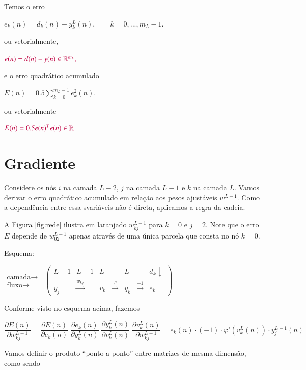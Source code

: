 \documentclass[12pt,a4paper]{article}
\def\RR{\mathbb{R}}
\begin{document}
\noindent Temos o erro

$
e_k(n) = d_k(n) - y^L_k(n), \qquad k=0,...,m_L-1.
$

ou vetorialmente,

$\color{purple}
e(n) = d(n)-y(n) \in\RR^{m_L},
$

\noindent e o erro quadrático acumulado

$
\displaystyle E(n) = 0.5\sum_{k=0}^{m_L-1}e_k^2(n).
$

ou vetorialmente

$\color{purple}
E(n) = 0.5e(n)^Te(n) \in\RR
$








\section{Gradiente}
Considere os nós $i$ na camada $L-2$, $j$ na camada $L-1$ e $k$ na camada $L$. Vamos derivar o erro quadrático acumulado em relação aos pesos ajustáveis $w^{L-1}$. Como a dependência entre essa svariáveis não é direta, aplicamos a regra da cadeia.

A Figura \ref{fig:rede} ilustra em laranjado $w_{kj}^{L-1}$ para $k=0$ e $j=2$. Note que o erro $E$ depende de $w_{02}^{L-1}$ apenas através de uma única parcela que consta no nó $k=0$.

\noindent Esquema:

$
\begin{matrix}
	\mbox{camada}\rightarrow\\
	\mbox{fluxo}\rightarrow
\end{matrix}\;\;
\begin{pmatrix}
	L-1 & L-1 & L &&L&&d_k\downarrow\\
	y_j & \stackrel{w_{kj}}{\longrightarrow}&
	v_k & \stackrel{\varphi}{\longrightarrow}&y_k&
	\stackrel{-1}{\longrightarrow}& e_k
\end{pmatrix}
$

\noindent Conforme visto no esquema acima, fazemos

$
\dfrac{\partial E(n)}{\partial w_{kj}^{L-1}}
=
\dfrac{\partial E(n)}{\partial e_k(n)}
\;
\dfrac{\partial e_k(n)}{\partial y^{L}_k(n)}
\;
\dfrac{\partial y^L_k(n)}{\partial v_k^{L}(n)}
\;
\dfrac{\partial v_k^L(n)}{\partial w^{L-1}_{kj}}
=
e_k(n) \cdot (-1) \cdot \varphi'(v_k^L(n)) \cdot y^{L-1}_j(n)
$

\noindent Vamos definir o produto ``ponto-a-ponto'' entre matrizes de mesma dimensão, como sendo
\end{document}

